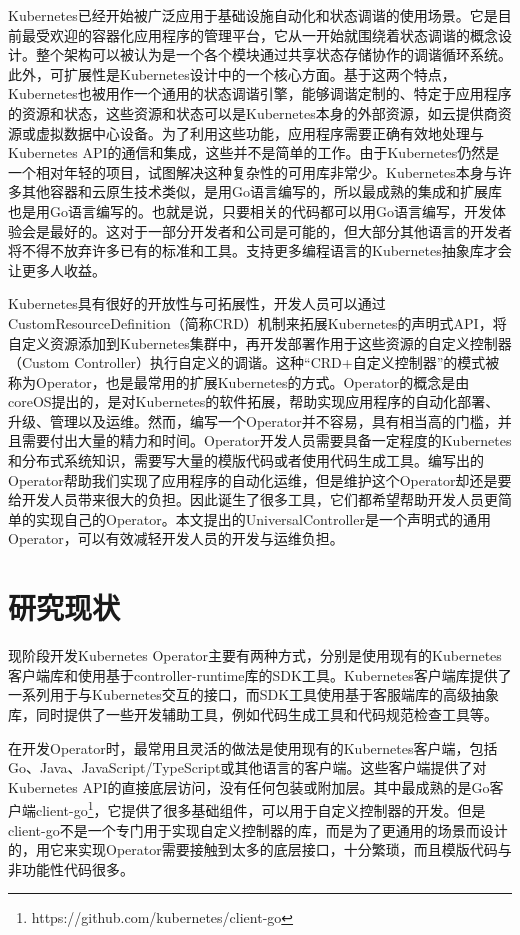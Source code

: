 \documentclass[macfonts,master]{njuthesis}
\begin{document}
Kubernetes已经开始被广泛应用于基础设施自动化和状态调谐的使用场景。它是目前最受欢迎的容器化应用程序的管理平台，它从一开始就围绕着状态调谐的概念设计。整个架构可以被认为是一个各个模块通过共享状态存储协作的调谐循环系统。此外，可扩展性是Kubernetes设计中的一个核心方面。基于这两个特点，Kubernetes也被用作一个通用的状态调谐引擎，能够调谐定制的、特定于应用程序的资源和状态，这些资源和状态可以是Kubernetes本身的外部资源，如云提供商资源或虚拟数据中心设备。为了利用这些功能，应用程序需要正确有效地处理与Kubernetes API的通信和集成，这些并不是简单的工作。由于Kubernetes仍然是一个相对年轻的项目，试图解决这种复杂性的可用库非常少。Kubernetes本身与许多其他容器和云原生技术类似，是用Go语言编写的，所以最成熟的集成和扩展库也是用Go语言编写的。也就是说，只要相关的代码都可以用Go语言编写，开发体验会是最好的。这对于一部分开发者和公司是可能的，但大部分其他语言的开发者将不得不放弃许多已有的标准和工具。支持更多编程语言的Kubernetes抽象库才会让更多人收益。

Kubernetes具有很好的开放性与可拓展性，开发人员可以通过CustomResourceDefinition（简称CRD）机制来拓展Kubernetes的声明式API，将自定义资源添加到Kubernetes集群中，再开发部署作用于这些资源的自定义控制器（Custom Controller）执行自定义的调谐。这种``CRD+自定义控制器''的模式被称为Operator，也是最常用的扩展Kubernetes的方式。Operator的概念是由coreOS提出的，是对Kubernetes的软件拓展，帮助实现应用程序的自动化部署、升级、管理以及运维\cite{operators}。然而，编写一个Operator并不容易，具有相当高的门槛，并且需要付出大量的精力和时间。Operator开发人员需要具备一定程度的Kubernetes和分布式系统知识，需要写大量的模版代码或者使用代码生成工具。编写出的Operator帮助我们实现了应用程序的自动化运维，但是维护这个Operator却还是要给开发人员带来很大的负担\cite{problemofoperators}。因此诞生了很多工具，它们都希望帮助开发人员更简单的实现自己的Operator。本文提出的UniversalController是一个声明式的通用Operator，可以有效减轻开发人员的开发与运维负担。

\section{研究现状}

现阶段开发Kubernetes Operator主要有两种方式，分别是使用现有的Kubernetes客户端库和使用基于controller-runtime库的SDK工具。Kubernetes客户端库提供了一系列用于与Kubernetes交互的接口，而SDK工具使用基于客服端库的高级抽象库，同时提供了一些开发辅助工具，例如代码生成工具和代码规范检查工具等。

在开发Operator时，最常用且灵活的做法是使用现有的Kubernetes客户端，包括Go、Java、JavaScript/TypeScript或其他语言的客户端。这些客户端提供了对Kubernetes API的直接底层访问，没有任何包装或附加层。其中最成熟的是Go客户端client-go\footnote{https://github.com/kubernetes/client-go}，它提供了很多基础组件，可以用于自定义控制器的开发。但是client-go不是一个专门用于实现自定义控制器的库，而是为了更通用的场景而设计的，用它来实现Operator需要接触到太多的底层接口，十分繁琐，而且模版代码与非功能性代码很多。
\end{document}
